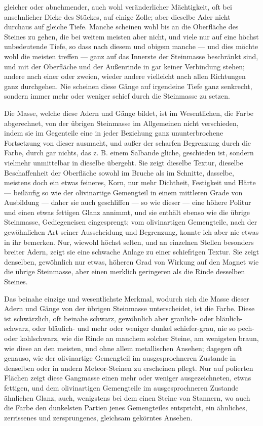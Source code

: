 \documentclass[a4paper, 11pt, oneside, german]{article}
\begin{document}
gleicher oder abnehmender, auch wohl veränderlicher Mächtigkeit, oft bei ansehnlicher Dicke des Stückes, auf einige Zolle; aber dieselbe Ader nicht durchaus auf gleiche Tiefe. Manche scheinen wohl bis an die Oberfläche des Steines zu gehen, die bei weitem meisten aber nicht, und viele nur auf eine höchst unbedeutende Tiefe, so dass nach diesem und obigem manche --- und dies möchte wohl die meisten treffen --- ganz auf das Innerste der Steinmasse beschränkt sind, und mit der Oberfläche und der Außenrinde in gar keiner Verbindung stehen; andere nach einer oder zweien, wieder andere vielleicht nach allen Richtungen ganz durchgehen. Nie scheinen diese Gänge auf irgendeine Tiefe ganz senkrecht, sondern immer mehr oder weniger schief durch die Steinmasse zu setzen.

Die Masse, welche diese Adern und Gänge bildet, ist im Wesentlichen, die Farbe abgerechnet, von der übrigen Steinmasse im Allgemeinen nicht verschieden, indem sie im Gegenteile eine in jeder Beziehung ganz ununterbrochene Fortsetzung von dieser ausmacht, und außer der scharfen Begrenzung durch die Farbe, durch gar nichts, das z. B. einem Salbande gliche, geschieden ist, sondern vielmehr unmittelbar in dieselbe übergeht. Sie zeigt dieselbe Textur, dieselbe Beschaffenheit der Oberfläche sowohl im Bruche als im Schnitte, dasselbe, meistens doch ein etwas feineres, Korn, nur mehr Dichtheit, Festigkeit und Härte --- beiläufig so wie der olivinartige Gemengteil in einem mittleren Grade von Ausbildung --- daher sie auch geschliffen --- so wie dieser --- eine höhere Politur und einen etwas fettigen Glanz annimmt, und sie enthält ebenso wie die übrige Steinmasse, Gediegeneisen eingesprengt; vom olivinartigen Gemengteile, nach der gewöhnlichen Art seiner Ausscheidung und Begrenzung, konnte ich aber nie etwas in ihr bemerken. Nur, wiewohl höchst selten, und an einzelnen Stellen besonders breiter Adern, zeigt sie eine schwache Anlage zu einer schiefrigen Textur. Sie zeigt denselben, gewöhnlich nur etwas, höheren Grad von Wirkung auf den Magnet wie die übrige Steinmasse, aber einen merklich geringeren als die Rinde desselben Steines.

Das beinahe einzige und wesentlichste Merkmal, wodurch sich die Masse dieser Adern und Gänge von der übrigen Steinmasse unterscheidet, ist die Farbe. Diese ist schwärzlich, oft beinahe schwarz, gewöhnlich aber graulich- oder bläulich-schwarz, oder bläulich- und mehr oder weniger dunkel schiefer-grau, nie so pech- oder kohlschwarz, wie die Rinde an manchem solcher Steine, am wenigsten braun, wie diese an den meisten, und ohne allem metallischen Ansehen; dagegen oft genauso, wie der olivinartige Gemengteil im ausgesprochneren Zustande in denselben oder in andern Meteor-Steinen zu erscheinen pflegt. Nur auf polierten Flächen zeigt diese Gangmasse einen mehr oder weniger ausgezeichneten, etwas fettigen, und dem olivinartigen Gemengteile im ausgesprochneren Zustande ähnlichen Glanz, auch, wenigstens bei dem einen Steine von Stannern, wo auch die Farbe den dunkelsten Partien jenes Gemengteiles entspricht, ein ähnliches, zerrissenes und zersprungenes, gleichsam gekörntes Ansehen.
\end{document}
